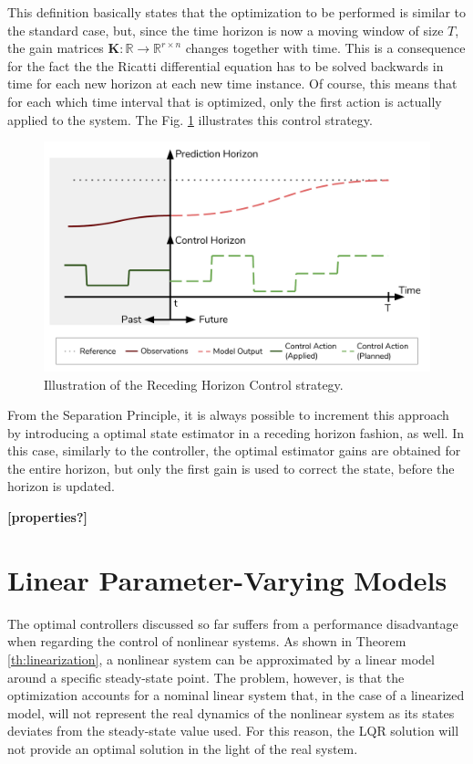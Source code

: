 \documentclass[a4paper,11pt]{book}
\numberwithin{figure}{chapter}
\numberwithin{equation}{chapter}
\numberwithin{table}{chapter}
\theoremstyle{definition}
\begin{document}
This definition basically states that the optimization to be performed is similar to the standard case, but, since the time horizon is now a moving window of size $T$, the gain matrices $\bm{K} : \mathbb{R} \rightarrow \mathbb{R}^{r \times n}$ changes together with time. This is a consequence for the fact the the Ricatti differential equation has to be solved backwards in time for each new horizon at each new time instance. Of course, this means that for each which time interval that is optimized, only the first action is actually applied to the system. The Fig. \ref{fig:rhc01} illustrates this control strategy.

\begin{figure}[ht]
	\centering
	\includegraphics[width=\textwidth]{chapter5/recedingHorizon}
	\caption{Illustration of the Receding Horizon Control strategy.}
	\label{fig:rhc01}
\end{figure}

From the Separation Principle, it is always possible to increment this approach by introducing a optimal state estimator in a receding horizon fashion, as well. In this case, similarly to the controller, the optimal estimator gains are obtained for the entire horizon, but only the first gain is used to correct the state, before the horizon is updated.

\textbf{[properties?]}

\section{Linear Parameter-Varying Models}

The optimal controllers discussed so far suffers from a performance disadvantage when regarding the control of nonlinear systems. As shown in Theorem \ref{th:linearization}, a nonlinear system can be approximated by a linear model around a specific steady-state point. The problem, however, is that the optimization accounts for a nominal linear system that, in the case of a linearized model, will not represent the real dynamics of the nonlinear system as its states deviates from the steady-state value used. For this reason, the LQR solution will not provide an optimal solution in the light of the real system.
\end{document}
